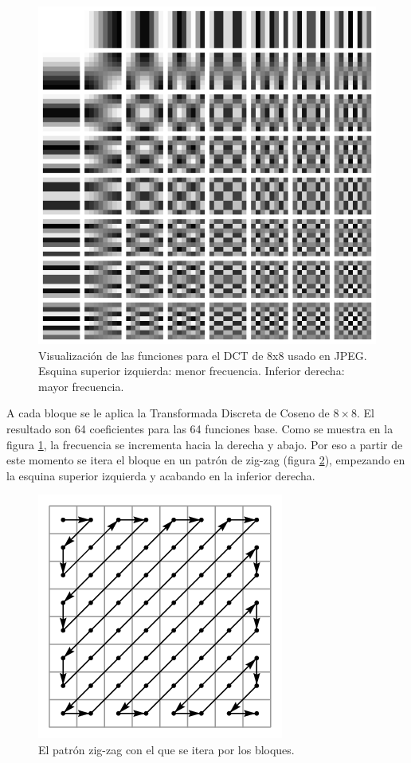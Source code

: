 \begin{figure}[h]
    \includegraphics{DCT-8x8}
    \caption{Visualización de las funciones para el DCT de 8x8 usado en JPEG.
    Esquina superior izquierda: menor frecuencia. Inferior derecha: mayor
frecuencia.}
    \label{fig:dct}
\end{figure}



A cada bloque se le aplica la Transformada Discreta de Coseno de $8\times8$. El
resultado son 64 coeficientes para las 64 funciones base. Como se muestra en la
figura \ref{fig:dct}, la frecuencia se incrementa hacia la derecha y abajo. Por
eso a partir de este momento se itera el bloque en un patrón de zig-zag
(figura \ref{fig:zigzag}), empezando en la esquina superior izquierda y acabando en la
inferior derecha.

\begin{figure}[h]
    \includegraphics{zigzag}
    \caption{El patrón zig-zag con el que se itera por los bloques.}
    \label{fig:zigzag}
\end{figure}

